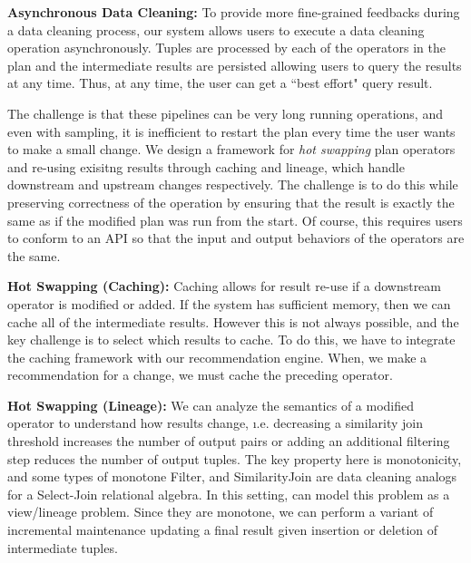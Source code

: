 \vspace{.5em}
{\noindent \bf Asynchronous Data Cleaning:} To provide more fine-grained feedbacks during a data cleaning process, our system allows users to execute a data cleaning operation asynchronously. Tuples are processed by each of the operators in the plan and the intermediate results are persisted allowing users to query the results at any time. Thus, at any time, the user can get a ``best effort" query result.

\vspace{.5em}

The challenge is that these pipelines can be very long running operations, and even with sampling, it is inefficient to restart the plan every time the user wants to make a small change.
We design a framework for \emph{hot swapping} plan operators and re-using exisitng results through caching and lineage, which handle downstream and upstream changes respectively.
The challenge is to do this while preserving correctness of the operation by ensuring that the result is exactly the same as if the modified plan was run from the start.
Of course, this requires users to conform to an API so that the input and output behaviors of the operators are the same.


\vspace{.5em}

{\noindent \bf Hot Swapping (Caching): } Caching allows for result re-use if a downstream operator is modified or added.
If the system has sufficient memory, then we can cache all of the intermediate results. 
However this is not always possible, and the key challenge is to select which results to cache.
To do this, we have to integrate the caching framework with our recommendation engine.
When, we make a recommendation for a change, we must cache the preceding operator. 

\vspace{.5em}

{\noindent \bf Hot Swapping (Lineage): } We can analyze the
semantics of a modified operator to understand how results change, \i.e. decreasing a similarity join threshold increases the number of output pairs or adding an additional filtering step reduces the number of output tuples. 
The key property here is monotonicity, and some types of monotone \textsf{Filter}, and \textsf{SimilarityJoin} are data cleaning analogs for a Select-Join relational algebra.
In this setting, can model this problem as a view/lineage problem.
Since they are monotone, we can perform a variant of incremental maintenance updating a final result given insertion or deletion of intermediate tuples.

